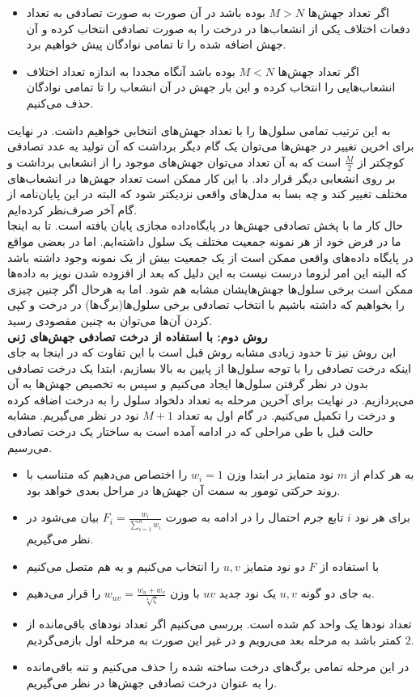 \begin{itemize}
	\item اگر تعداد جهش‌ها $M>N$ بوده باشد در آن صورت به صورت تصادفی به تعداد دفعات اختلاف یکی از انشعاب‌ها در درخت را به صورت تصادفی انتخاب کرده و آن جهش اضافه شده را تا تمامی نوادگان پیش خواهیم برد.
	\item اگر تعداد جهش‌ها $M<N$ بوده باشد آنگاه مجددا به اندازه تعداد اختلاف انشعاب‌هایی را انتخاب کرده و این بار جهش در آن انشعاب را تا تمامی نوادگان حذف می‌کنیم.  
\end{itemize}
به این ترتیب تمامی سلول‌ها را با تعداد جهش‌های انتخابی خواهیم داشت. در نهایت برای اخرین تغییر در جهش‌ها می‌توان یک گام دیگر برداشت که آن تولید یه عدد تصادفی کوچکتر از $\frac{M}{2}$ است که به آن تعداد می‌توان جهش‌های موجود را از انشعابی برداشت و بر روی انشعابی دیگر قرار داد. با این کار ممکن است تعداد جهش‌ها در انشعاب‌های مختلف تغییر کند و چه بسا به مدل‌های واقعی نزدیکتر شود که البته در این پایان‌نامه از گام آخر صرف‌نظر کرده‌ایم.
\\
حال کار ما با پخش تصادفی جهش‌ها در پایگاه‌داده مجازی پایان یافته است. تا به اینجا ما در فرض خود از هر نمونه جمعیت مختلف یک سلول داشته‌ایم. اما  در بعضی مواقع در پایگاه داده‌های واقعی ممکن است از یک جمعیت بیش از یک نمونه وجود داشته باشد که البته این امر لزوما درست نیست به این دلیل که بعد از افزوده شدن نویز به داده‌ها ممکن است برخی سلول‌ها جهش‌هایشان مشابه هم شود. اما به هرحال اگر چنین چیزی را بخواهیم که داشته باشیم با انتخاب تصادفی برخی سلول‌ها(برگ‌ها) در درخت و کپی کردن آن‌ها می‌توان به چنین مقصودی رسید.
\vspace{20pt}
\\ \textbf{روش دوم: با استفاده از درخت تصادفی جهش‌های ژنی}	
\\
این روش نیز تا حدود زیادی مشابه روش قبل است با این تفاوت که در اینجا به جای اینکه درخت تصادفی را با توجه سلول‌ها از پایین به بالا بسازیم، ابتدا یک درخت تصادفی بدون در نظر گرفتن سلول‌ها ایجاد می‌کنیم و سپس به تخصیص جهش‌ها به آن می‌پردازیم. در نهایت برای آخرین مرحله به تعداد دلخواد سلول را به درخت اضافه کرده و درخت را تکمیل می‌کنیم. در گام اول به تعداد $M+1$ نود در نظر می‌گیریم. مشابه حالت قبل با طی مراحلی که در ادامه آمده است به ساختار یک درخت تصادفی می‌رسیم.
\begin{itemize}
	\item به هر کدام از $m$ نود متمایز در ابتدا وزن $w_i=1$ را اختصاص می‌دهیم که متناسب با روند حرکتی تومور به سمت آن جهش‌ها در مراحل بعدی خواهد بود.
	\item برای هر نود ‌$i$ تابع جرم احتمال را در ادامه به صورت $F_i=\frac{w_i}{\sum_{i=1}^{n}w_i}$ بیان می‌شود در نظر می‌گیریم.
	\item با استفاده از $F$ دو نود متمایز $u, v$ را انتخاب می‌کنیم و به هم متصل می‌کنیم
	\item به جای دو گونه $u, v$ یک نود جدید $uv$ با وزن $w_{uv}=\frac{w_u+w_v}{\sqrt[4]{\zeta}}$ را قرار می‌دهیم.
	\item تعداد نود‌ها یک واحد کم شده است. بررسی می‌کنیم اگر تعداد نود‌های باقی‌مانده از $2$ کمتر باشد به مرحله بعد می‌رویم و در غیر این صورت به مرحله اول بازمی‌گردیم.
	\item در این مرحله تمامی برگ‌های درخت ساخته شده را حذف می‌کنیم و تنه باقی‌مانده را به عنوان درخت تصادفی جهش‌ها در نظر می‌گیریم.
\end{itemize}

